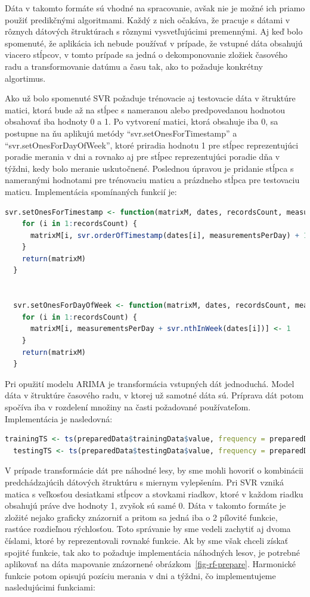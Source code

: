 \documentclass[a4paper,slovak,12pt,appendix]{article}
\begin{document}
Dáta v takomto formáte sú vhodné na spracovanie, avšak nie je možné ich priamo
použiť predikčnými algoritmami. Každý z nich očakáva, že pracuje s dátami
v rôznych dátových štruktúrach s rôznymi vysvetľujúcimi premennými. Aj keď bolo
spomenuté, že aplikácia ich nebude používať v prípade, že vstupné dáta obsahujú
viacero stĺpcov, v tomto prípade sa jedná o dekomponovanie zložiek časového radu
a transformovanie datúmu a času tak, ako to požaduje konkrétny algortimus.

Ako už bolo spomenuté SVR požaduje trénovacie aj testovacie dáta v štruktúre
matici, ktorá bude až na stĺpec s nameranou alebo predpovedanou hodnotou
obsahovať iba hodnoty 0 a 1. Po vytvorení matici, ktorá obsahuje iba 0, sa
postupne na ňu aplikujú metódy ``svr.setOnesForTimestamp'' a ``svr.setOnesForDayOfWeek'',
ktoré priradia hodnotu 1 pre stĺpec reprezentujúci poradie merania v dni a
rovnako aj pre stĺpec reprezentujúci poradie dňa v týždni, kedy bolo meranie
uskutočnené. Poslednou úpravou je pridanie stĺpca s nameranými hodnotami pre
trénovaciu maticu a prázdneho stĺpca pre testovaciu maticu. Implementácia
spomínaných funkcií je:

\begin{lstlisting}[language=R]
  svr.setOnesForTimestamp <- function(matrixM, dates, recordsCount, measurementsPerDay) {
    for (i in 1:recordsCount) {
      matrixM[i, svr.orderOfTimestamp(dates[i], measurementsPerDay) + 1] <- 1
    }
    return(matrixM)
  }


  svr.setOnesForDayOfWeek <- function(matrixM, dates, recordsCount, measurementsPerDay) {
    for (i in 1:recordsCount) {
      matrixM[i, measurementsPerDay + svr.nthInWeek(dates[i])] <- 1
    }
    return(matrixM)
  }
\end{lstlisting}

Pri opužití modelu ARIMA je transformácia vstupných dát jednoduchá. Model
dáta v štruktúre časového radu, v ktorej už samotné dáta sú. Príprava dát potom
spočíva iba v rozdelení množiny na časti požadované používateľom. Implementácia
je nasledovná:

\begin{lstlisting}[language=R]
  trainingTS <- ts(preparedData$trainingData$value, frequency = preparedData$measurementsPerDay)
  testingTS <- ts(preparedData$testingData$value, frequency = preparedData$measurementsPerDay)
\end{lstlisting}

V prípade transformácie dát pre náhodné lesy, by sme mohli hovoriť o kombinácii
predchádzajúcih dátových štruktúru s miernym vylepšením. Pri SVR vzniká matica
s veľkosťou desiatkami stĺpcov a stovkami riadkov, ktoré v každom riadku
obsahujú práve dve hodnoty 1, zvyšok sú samé 0. Dáta v takomto formáte je
zložité nejako graficky znázorniť a pritom sa jedná iba o 2 pílovité funkcie,
rastúce rozdieľnou rýchlosťou. Toto správanie by sme vedeli zachytiť aj dvoma
číslami, ktoré by reprezentovali rovnaké funkcie. Ak by sme však chceli získať
spojité funkcie, tak ako to požaduje implementácia náhodných lesov, je potrebné
aplikovať na dáta mapovanie znázornené obrázkom~\ref{fig-rf-prepare}. Harmonické
funkcie potom opisujú pozíciu merania v dni a týždni, čo implementujeme
nasledujúcimi funkciami:
\end{document}
